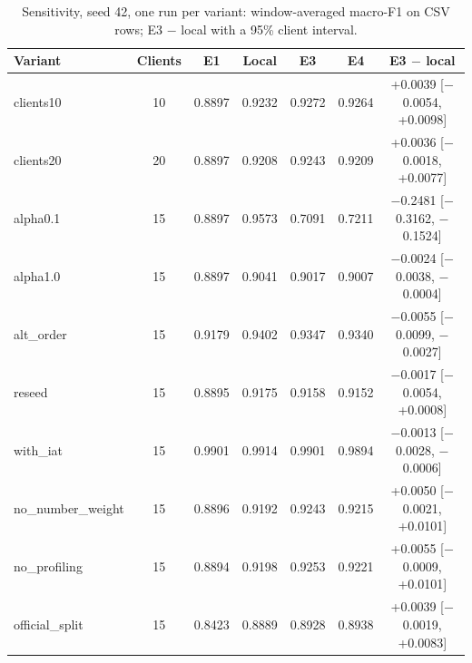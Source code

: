 \begin{table}[t]
\centering
\caption{Sensitivity, seed 42, one run per variant: window-averaged macro-F1 on CSV rows; E3 $-$ local with a 95\% client interval.}
\label{tab:sensitivity}
\begin{tabular}{lcccccc}
\toprule
Variant & Clients & E1 & Local & E3 & E4 & E3 $-$ local \\
\midrule
clients10 & 10 & 0.8897 & 0.9232 & 0.9272 & 0.9264 & +0.0039 [$-$0.0054, +0.0098] \\
clients20 & 20 & 0.8897 & 0.9208 & 0.9243 & 0.9209 & +0.0036 [$-$0.0018, +0.0077] \\
alpha0.1 & 15 & 0.8897 & 0.9573 & 0.7091 & 0.7211 & $-$0.2481 [$-$0.3162, $-$0.1524] \\
alpha1.0 & 15 & 0.8897 & 0.9041 & 0.9017 & 0.9007 & $-$0.0024 [$-$0.0038, $-$0.0004] \\
alt\_order & 15 & 0.9179 & 0.9402 & 0.9347 & 0.9340 & $-$0.0055 [$-$0.0099, $-$0.0027] \\
reseed & 15 & 0.8895 & 0.9175 & 0.9158 & 0.9152 & $-$0.0017 [$-$0.0054, +0.0008] \\
with\_iat & 15 & 0.9901 & 0.9914 & 0.9901 & 0.9894 & $-$0.0013 [$-$0.0028, $-$0.0006] \\
no\_number\_weight & 15 & 0.8896 & 0.9192 & 0.9243 & 0.9215 & +0.0050 [$-$0.0021, +0.0101] \\
no\_profiling & 15 & 0.8894 & 0.9198 & 0.9253 & 0.9221 & +0.0055 [$-$0.0009, +0.0101] \\
official\_split & 15 & 0.8423 & 0.8889 & 0.8928 & 0.8938 & +0.0039 [$-$0.0019, +0.0083] \\
\bottomrule
\end{tabular}
\end{table}
